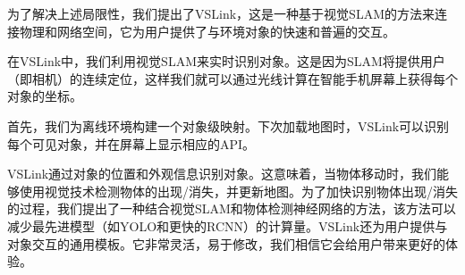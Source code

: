 %
为了解决上述局限性，我们提出了VSLink，这是一种基于视觉SLAM的方法来连接物理和网络空间，它为用户提供了与环境对象的快速和普遍的交互。

在VSLink中，我们利用视觉SLAM来实时识别对象。这是因为SLAM将提供用户（即相机）的连续定位，这样我们就可以通过光线计算在智能手机屏幕上获得每个对象的坐标。

首先，我们为离线环境构建一个对象级映射。下次加载地图时，VSLink可以识别每个可见对象，并在屏幕上显示相应的API。

VSLink通过对象的位置和外观信息识别对象。这意味着，当物体移动时，我们能够使用视觉技术检测物体的出现/消失，并更新地图。为了加快识别物体出现/消失的过程，我们提出了一种结合视觉SLAM和物体检测神经网络的方法，该方法可以减少最先进模型（如YOLO和更快的RCNN）的计算量。VSLink还为用户提供与对象交互的通用模板。它非常灵活，易于修改，我们相信它会给用户带来更好的体验。

